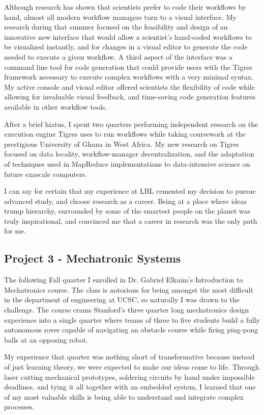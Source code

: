 \documentclass[journal]{IEEEtran}
\begin{document}
Although research has shown that scientists prefer to code their workflows by hand, almost all modern workflow managers turn to a visual interface. My research during that summer focused on the feasibility and design of an innovative new interface that would allow a scientist's hand-coded workflows to be visualized instantly, and for changes in a visual editor to generate the code needed to execute a given workflow. A third aspect of the interface was a command line tool for code generation that could provide users with the Tigres framework necessary to execute complex workflows with a very minimal syntax. My active console and visual editor offered scientists the flexibility of code while allowing for invaluable visual feedback, and time-saving code generation features available in other workflow tools. 

After a brief hiatus, I spent two quarters performing independent research on the execution engine Tigres uses to run workflows while taking coursework at the prestigious University of Ghana in West Africa. My new research on Tigres focused on data locality, workflow-manager decentralization, and the adaptation of techniques used in MapReduce implementations to data-intensive science on future exascale computers.

I can say for certain that my experience at LBL cemented my decision to pursue advanced study, and choose research as a career. Being at a place where ideas trump hierarchy, surrounded by some of the smartest people on the planet was truly inspirational, and convinced me that a career in research was the only path for me. 

\subsection{Project 3 - Mechatronic Systems}
The following Fall quarter I enrolled in Dr. Gabriel Elkaim's Introduction to Mechatronics course. The class is notorious for being amongst the most difficult in the department of engineering at UCSC, so naturally I was drawn to the challenge. The course crams Stanford's three quarter long mechatronics design experience into a single quarter where teams of three to five students build a fully autonomous rover capable of navigating an obstacle course while firing ping-pong balls at an opposing robot. 

My experience that quarter was nothing short of transformative because instead of just learning theory, we were expected to make our ideas come to life. Through laser cutting mechanical prototypes, soldering circuits by hand under impossible deadlines, and tying it all together with an embedded system, I learned that one of my most valuable skills is being able to understand and integrate complex processes.
\end{document}
